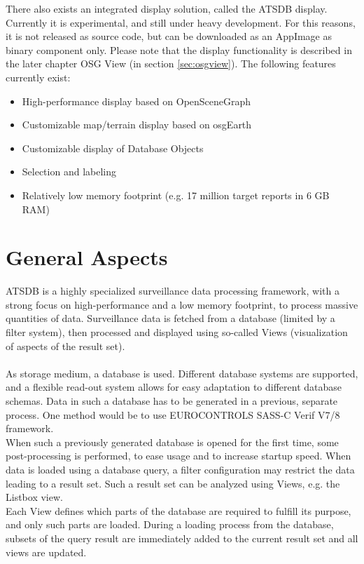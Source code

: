 There also exists an integrated display solution, called the ATSDB display. Currently it is experimental, and still under heavy development. For this reasons, it is not released as source code, but can be downloaded as an AppImage as binary component only. Please note that the display functionality is described in the later chapter OSG View (in section \ref{sec:osgview}). The following features currently exist:

\begin{itemize}  
\item High-performance display based on OpenSceneGraph
\item Customizable map/terrain display based on osgEarth
\item Customizable display of Database Objects
\item Selection and labeling
\item Relatively low memory footprint (e.g. 17 million target reports in 6 GB RAM)
\end{itemize}

\section{General Aspects}
ATSDB is a highly specialized surveillance data processing framework, with a strong focus on high-performance and  a  low  memory  footprint,  to  process  massive  quantities  of  data.   Surveillance  data  is fetched from a database (limited by a filter system), then processed and displayed using so-called Views (visualization of aspects of the result set).\\\\

As storage medium, a database is used.  Different database systems are supported, and a flexible read-out system allows for easy adaptation to different database schemas.  Data in such a database has to be generated in a previous, separate process.  One method would be to use EUROCONTROLS SASS-C  Verif V7/8 framework.\\

When such a previously generated database is opened for the first time, some post-processing is performed, to ease usage and to increase startup speed.  When data is loaded using a database query, a filter configuration may restrict the data leading to a result set.  Such a result set can be analyzed using Views, e.g. the Listbox view.\\

Each View defines which parts of the database are required to fulfill its purpose, and only such parts are loaded.  During a loading process from the database, subsets of the query result are immediately added to the current result set and all views are updated. 
